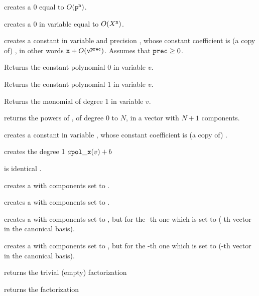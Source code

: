 \label{se:clean}

 creates a $0$  equal to
$O({\tt p}^{\tt n})$.

 creates a $0$  in variable
 equal to $O(X^{\tt n})$.

 creates a constant 
in variable  and precision , whose constant coefficient is
(a copy of) , in other words ${\tt x} + O({\tt v}^{\tt prec})$.
Assumes that ${\tt prec}\geq 0$.

 Returns the constant polynomial $0$ in variable $v$.

 Returns the constant polynomial $1$ in variable $v$.

 Returns the monomial of degree $1$ in variable $v$.

 returns the powers of
, of degree $0$ to $N$, in a vector with $N+1$ components.

 creates a constant  in variable
, whose constant coefficient is (a copy of) .

 creates the degree 1 
$a {\tt pol\_x}(v) + b$

 is identical .

 creates a  with  components set to
.

 creates a  with  components set to
.

 creates a  with  components
set to , but for the -th one which is set to 
(-th vector in the canonical basis).

 creates a  with  components
set to , but for the -th one which is set to 
(-th vector in the canonical basis).

 returns the trivial (empty) factorization

 returns the factorization


